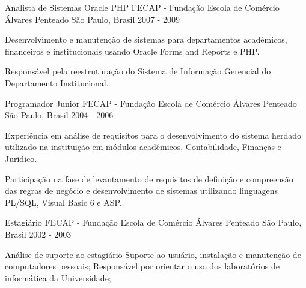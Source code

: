 \begin{cventries}
  \cventry
    {Analista de Sistemas Oracle PHP} %
    {FECAP - Fundação Escola de Comércio Álvares Penteado} %
    {São Paulo, Brasil} %
    {2007 - 2009} %
    {
      \begin{cvitems} %
        \item {Desenvolvimento e manutenção de sistemas para departamentos acadêmicos, financeiros e institucionais usando Oracle Forms and Reports e PHP.}
       \item{Responsável pela reestruturação do Sistema de Informação Gerencial do Departamento Institucional.}
      \end{cvitems}
    }

  \cventry
    {Programador Junior} %
    {FECAP - Fundação Escola de Comércio Álvares Penteado} %
    {São Paulo, Brasil} %
    {2004 - 2006} %
    {
      \begin{cvitems} %
        \item {Experiência em análise de requisitos para o desenvolvimento do sistema herdado utilizado na instituição em módulos acadêmicos, Contabilidade, Finanças e Jurídico.}
        \item {Participação na fase de levantamento de requisitos de definição e compreensão das regras de negócio e desenvolvimento de sistemas utilizando linguagens PL/SQL, Visual Basic 6 e ASP.}
      \end{cvitems}
    }

  \cventry
    {Estagiário} %
    {FECAP - Fundação Escola de Comércio Álvares Penteado} %
    {São Paulo, Brasil} %
    {2002 - 2003} %
    {
      \begin{cvitems} %
        \item {Análise de suporte ao estagiário
Suporte ao usuário, instalação e manutenção de computadores pessoais;
Responsável por orientar o uso dos laboratórios de informática da Universidade;}
      \end{cvitems}
    }

\end{cventries}

